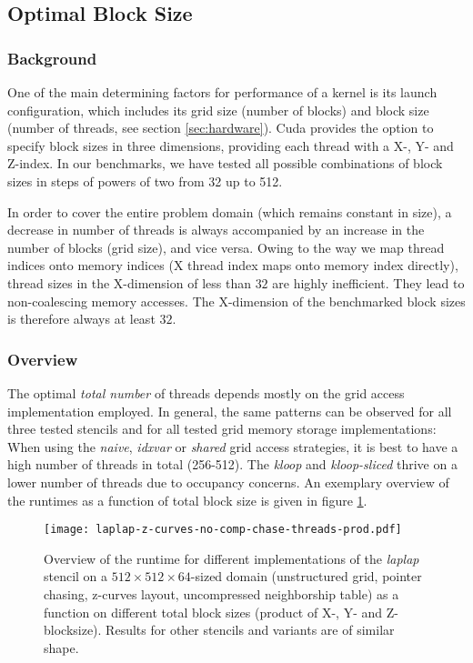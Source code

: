 \subsection{Optimal Block Size} \label{sec:res-blocksize}

\subsubsection{Background}

One of the main determining factors for performance of a kernel is its launch configuration, which includes its grid size (number of blocks) and block size (number of threads, see section \ref{sec:hardware}). Cuda provides the option to specify block sizes in three dimensions, providing each thread with a X-, Y- and Z-index. In our benchmarks, we have tested all possible combinations of block sizes in steps of powers of two from 32 up to 512.

In order to cover the entire problem domain (which remains constant in size), a decrease in number of threads is always accompanied by an increase in the number of blocks (grid size), and vice versa. Owing to the way we map thread indices onto memory indices (X thread index maps onto memory index directly), thread sizes in the X-dimension of less than $32$ are highly inefficient. They lead to non-coalescing memory accesses. The X-dimension of the benchmarked block sizes is therefore always at least $32$.

\subsubsection{Overview}

The optimal \emph{total number} of threads depends mostly on the grid access implementation employed. In general, the same patterns can be observed for all three tested stencils and for all tested grid memory storage implementations: When using the \emph{naive}, \emph{idxvar} or \emph{shared} grid access strategies, it is best to have a high number of threads in total (256-512). The \emph{kloop} and \emph{kloop-sliced} thrive on a lower number of threads due to occupancy concerns. An exemplary overview of the runtimes as a function of total block size is given in figure \ref{fig:blocksizes-overview}.

\begin{figure}
	\texttt{[image: laplap-z-curves-no-comp-chase-threads-prod.pdf]}
	\caption{\label{fig:blocksizes-overview} Overview of the runtime for different implementations of the \emph{laplap} stencil on a $512\times 512\times 64$-sized domain (unstructured grid, pointer chasing, z-curves layout, uncompressed neighborship table) as a function on different total block sizes (product of X-, Y- and Z-blocksize). Results for other stencils and variants are of similar shape.}
\end{figure}

